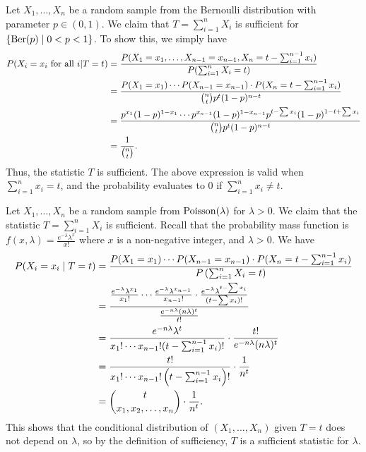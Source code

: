 \begin{example}
    Let $X_{1},\ldots,X_{n}$ be a random sample from the Bernoulli distribution with parameter $p \in (0,1)$. We claim that $T = \sum_{i=1}^{n} X_{i}$ is sufficient for $\{\operatorname{Ber}(p) \mid 0 < p < 1\}$. To show this, we simply have
    \begin{align}
        P(X_{i} = x_{i} \text{ for all } i | T = t) &= \frac{P(X_{1} = x_{1}, \ldots, X_{n-1} = x_{n-1}, X_{n} = t - \sum_{i=1}^{n-1} x_{i} )}{P(\sum_{i=1}^{n} X_{i} = t)} \\
        &= \frac{P(X_{1}=x_{1}) \cdots P(X_{n-1}=x_{n-1}) \cdot P(X_{n} = t - \sum_{i=1}^{n-1} x_{i})}{\binom{n}{t} p^{t} (1-p)^{n-t}} \notag\\
        &= \frac{p^{x_{1}}(1-p)^{1-x_{1}} \cdots p^{x_{n-1}}(1-p)^{1-x_{n-1}}p^{t-\sum x_{i}}(1-p)^{1-t+\sum x_{i}}}{\binom{n}{t} p^{t}(1-p)^{n-t}} \notag \\
        &= \frac{1}{\binom{n}{t}}.
    \end{align}
    Thus, the statistic $T$ is sufficient. The above expression is valid when $\sum_{i=1}^{n} x_{i} = t$, and the probability evaluates to 0 if $\sum_{i=1}^{n} x_{i} \neq t$.
\end{example}

\begin{example}
    Let $X_{1},\ldots,X_{n}$ be a random sample from $\operatorname{Poisson}(\lambda)$ for $\lambda > 0$. We claim that the statistic $T = \sum_{i=1}^{n} X_{i}$ is sufficient. Recall that the probability mass function is $f(x,\lambda) = \frac{e^{-\lambda} \lambda^{x}}{x!}$ where $x$ is a non-negative integer, and $\lambda > 0$. We have
    \begin{align}
        P(X_{i} = x_{i} \mid T = t) &= \frac{P(X_{1}=x_{1}) \cdots P(X_{n-1}=x_{n-1}) \cdot P(X_{n} = t- \sum_{i=1}^{n-1}x_{i})}{P\left(\sum_{i=1}^{n} X_{i} = t\right)} \\
        &= \frac{\frac{e^{-\lambda} \lambda^{x_{1}}}{x_{1}!} \cdots \frac{e^{-\lambda} \lambda^{x_{n-1}}}{x_{n-1}!} \cdot \frac{e^{-\lambda} \lambda^{t-\sum x_{i}}}{(t-\sum x_{i})!}}{\frac{e^{-n\lambda} (n\lambda)^{t}}{t!}} \notag\\
        &= \frac{e^{-n\lambda} \lambda^{t}}{x_{1}!\cdots x_{n-1}! (t - \sum_{i=1}^{n-1} x_i)!} \cdot \frac{t!}{e^{-n\lambda} (n\lambda)^t} \notag\\
        &= \frac{t!}{x_{1}! \cdots x_{n-1}! \left(t - \sum_{i=1}^{n-1} x_{i} \right)!} \cdot \frac{1}{n^t} \notag\\
        &= \binom{t}{x_{1},x_{2},\ldots,x_{n}} \cdot \frac{1}{n^{t}}.
    \end{align}
    This shows that the conditional distribution of $(X_{1},\ldots,X_{n})$ given $T = t$ does not depend on $\lambda$, so by the definition of sufficiency, $T$ is a sufficient statistic for $\lambda$.
\end{example}

